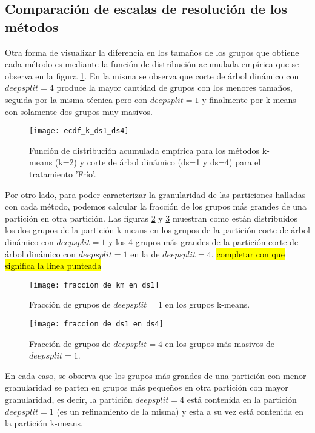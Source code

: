 \subsection{Comparación de escalas de resolución de los métodos}
Otra forma de visualizar la diferencia en los tamaños de los grupos que obtiene cada método es mediante la función de distribución acumulada empírica que se observa en la figura \ref{fig:ecdf_k_ds1_ds4}. En la misma se observa que corte de árbol dinámico con $deepsplit=4$ produce la mayor cantidad de grupos con los menores tamaños, seguida por la misma técnica pero con $deepsplit=1$ y finalmente por k-means con solamente dos grupos muy masivos.
\begin{figure}[h]
    \centering
    \texttt{[image: ecdf\_k\_ds1\_ds4]}
    \caption{Función de distribución acumulada empírica para los métodos k-means (k=2) y corte de árbol dinámico (ds=1 y ds=4) para el tratamiento 'Frío'.}
    \label{fig:ecdf_k_ds1_ds4}
\end{figure}
Por otro lado, para poder caracterizar la granularidad de las particiones halladas con cada método, podemos calcular la fracción de los grupos más grandes de una partición en otra partición. Las figuras \ref{fig:fraccion_de_km_en_ds1} y \ref{fig:fraccion_de_ds1_en_ds4} muestran como están distribuidos los dos grupos de la partición k-means en los grupos de la partición corte de árbol dinámico con $deepsplit=1$ y los 4 grupos más grandes de la partición corte de árbol dinámico con $deepsplit=1$ en la de $deepsplit=4$. \hl{completar con que significa la linea punteada}
\begin{figure*}[t!]
    \centering
    \begin{subfigure}[t]{0.8\textwidth}
    \centering
    \texttt{[image: fraccion\_de\_km\_en\_ds1]}
    \caption{Fracción de grupos de $deepsplit=1$ en los grupos k-means.}
    \label{fig:fraccion_de_km_en_ds1}
    \end{subfigure}

    \begin{subfigure}[t]{0.8\textwidth}
    \centering
    \texttt{[image: fraccion\_de\_ds1\_en\_ds4]}
    \caption{Fracción de grupos de $deepsplit=4$ en los grupos más masivos de $deepsplit=1$.}
    \label{fig:fraccion_de_ds1_en_ds4}
    \end{subfigure}
    \caption{Fracción de grupos de una partición más fina dentro de grupos en una partición más gruesa para el tratamiento 'Frío', con $deepsplit=1$, $deepsplit=4$ y k-means. \hl{completar con que significan los colores y la linea punteada}}
\end{figure*}
En cada caso, se observa que los grupos más grandes de una partición con menor granularidad se parten en grupos más pequeños en otra partición con mayor granularidad, es decir, la partición $deepsplit=4$ está contenida en la partición $deepsplit=1$ (es un refinamiento de la misma) y esta a su vez está contenida en la partición k-means.

